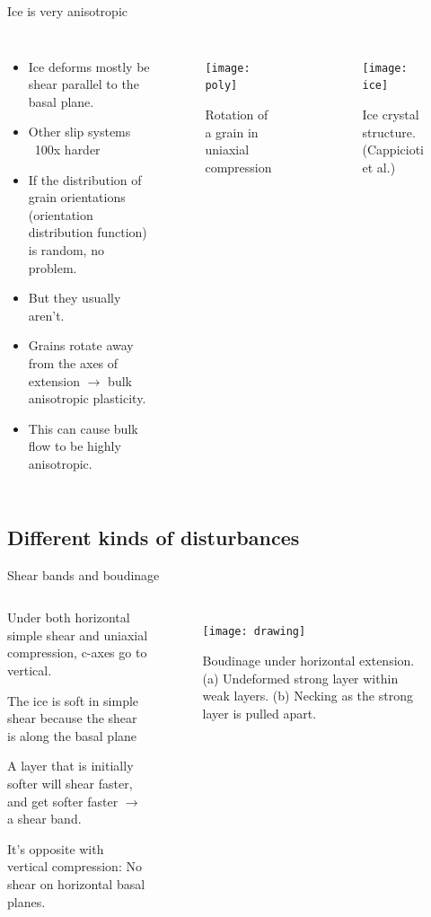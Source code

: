 \documentclass{beamer}
\begin{document}
\begin{frame}{Ice is very anisotropic}
  \begin{columns}[T]
  \begin{itemize}
  \item Ice deforms mostly be shear parallel to the basal plane.
  \item Other slip systems ~100x harder
  \item If the distribution of grain orientations (orientation distribution function) is random, no problem.
    \pause \item But they usually aren't.
    \pause \item Grains rotate away from the axes of extension $\rightarrow$ bulk anisotropic plasticity.
  \item This can cause bulk flow to be highly anisotropic.
  \end{itemize}
  \begin{figure}
     \texttt{[image: poly]}
     \caption{Rotation of a grain in uniaxial compression}
  \end{figure}
  \begin{figure}
     \texttt{[image: ice]}
     \caption{Ice crystal structure. (Cappicioti et al.)}
  \end{figure}
  \end{columns}
\end{frame}

\subsection{Different kinds of disturbances}
\begin{frame}{Shear bands and boudinage}
   \begin{columns}[T]
   \begin{itemize}
      \small{
      \item Under both horizontal simple shear and uniaxial compression, c-axes go to vertical.
      \item The ice is soft in simple shear because the shear is along the basal plane
      \item A layer that is initially softer will shear faster, and get softer faster
      $\rightarrow$ a shear band.
   }
      \item It's opposite with vertical compression: No shear on horizontal basal planes.
   \end{itemize}
   \begin{figure}
      \texttt{[image: drawing]}
      \caption{Boudinage under horizontal extension. (a) Undeformed strong layer within weak layers. (b) Necking as the strong layer is pulled apart.}
   \end{figure}
 
\end{columns}
\end{frame}
\end{document}
